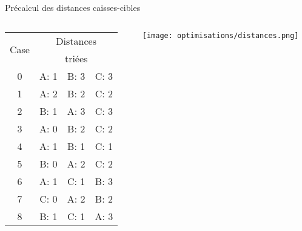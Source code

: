 \begin{frame}{Précalcul des distances caisses-cibles}
\begin{columns}[onlytextwidth]
{\begin{column}{0.49\textwidth}
                        \begin{tabular}{|c|c|c|c|}
                            \hline
                            \multirow{2}{2em}{Case} & \multicolumn{3}{|c|}{Distances} \\
                            & \multicolumn{3}{|c|}{triées} \\ \hline
                            0 & A: 1 & B: 3 & C: 3 \\ \hline
                            1 & A: 2 & B: 2 & C: 2 \\ \hline
                            2 & B: 1 & A: 3 & C: 3 \\ \hline
                            3 & A: 0 & B: 2 & C: 2 \\ \hline
                            4 & A: 1 & B: 1 & C: 1 \\ \hline
                            5 & B: 0 & A: 2 & C: 2 \\ \hline
                            6 & A: 1 & C: 1 & B: 3 \\ \hline
                            7 & C: 0 & A: 2 & B: 2 \\ \hline
                            8 & B: 1 & C: 1 & A: 3 \\ \hline
                        \end{tabular}
                    \end{column}
                }
                \begin{column}{0.5\textwidth}
                    \texttt{[image: optimisations/distances.png]}
                \end{column}

            \end{columns}
        \end{frame}

        

